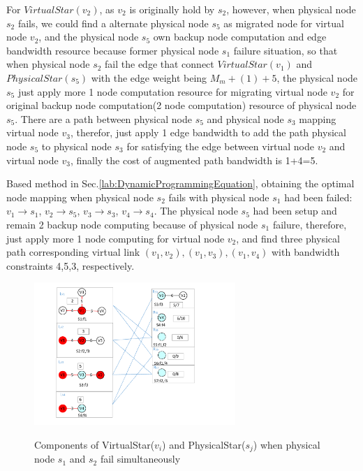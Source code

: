 For $VirtualStar(v_2)$, as $v_2$ is originally hold by $s_2$, however, when physical node $s_2$ fails, we could find a alternate physical node $s_5$ as migrated node for virtual node $v_2$, and the physical node $s_5$ own backup node computation and edge bandwidth resource because former physical node $s_1$ failure situation, so that when physical node $s_2$ fail the edge that connect $VirtualStar(v_1)$ and $PhysicalStar(s_5)$ with the edge weight being $M_m+(1)+5$, the physical node $s_5$ just apply more 1 node computation resource for migrating virtual node $v_2$ for original backup node computation(2 node computation) resource of physical node $s_5$. There are a path between physical node $s_5$ and physical node $s_3$ mapping virtual node $v_3$, therefor, just apply 1 edge bandwidth to add the path physical node $s_5$ to physical node $s_3$ for satisfying the edge between virtual node $v_2$ and virtual node $v_3$, finally the cost of augmented path bandwidth is 1+4=5.

Based method in Sec.\ref{lab:DynamicProgrammingEquation}, obtaining the optimal node mapping when physical node $s_2$ fails with physical node $s_1$ had been failed: $v_1 \rightarrow s_1$, $v_2 \rightarrow s_5$, $v_3 \rightarrow s_3$, $v_4 \rightarrow s_4$. The physical node $s_5$ had been setup and remain 2 backup node computing because of physical node $s_1$ failure, therefore, just apply more 1 node computing for virtual node $v_2$, and find three physical path corresponding virtual link $(v_1,v_2),(v_1,v_3),(v_1,v_4)$ with bandwidth constraints 4,5,3, respectively.


\begin{figure}
\centering
\includegraphics[width=3in]{Fig/StarRepresentationTwoFailure}\\
  \caption{Components of VirtualStar($v_i$) and PhysicalStar($s_j$) when physical node $s_1$ and $s_2$ fail simultaneously}\label{fig:StarRepresentationTwoFailure}
\end{figure}

